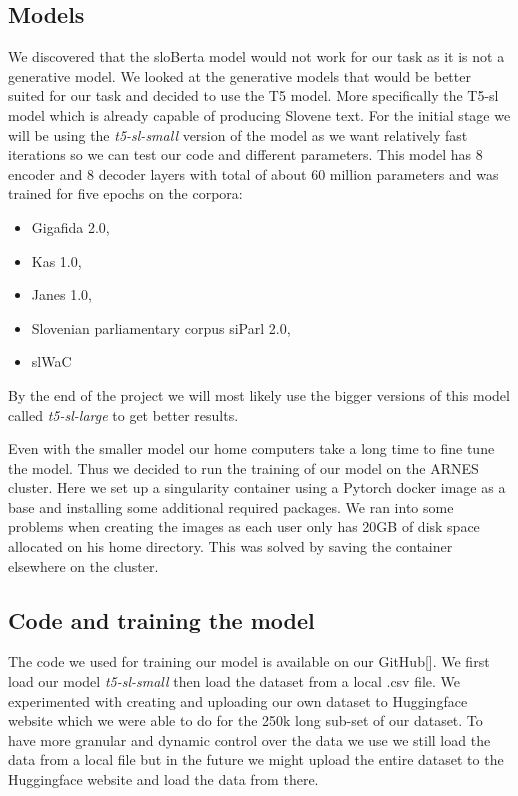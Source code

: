 \documentclass[fleqn,moreauthors,10pt]{ds_report}
\begin{document}
\subsection{Models}

We discovered that the sloBerta model would not work for our task as it is not a generative model. We looked at the generative models that would be better suited for our task and decided to use the T5 model. More specifically the T5-sl model which is already capable of producing Slovene text. For the initial stage we will be using the \emph{t5-sl-small} version of the model as we want relatively fast iterations so we can test our code and different parameters. This model has 8 encoder and 8 decoder layers with total of about 60 million parameters and was trained for five epochs on the corpora:
\begin{itemize}[itemsep=2pt]
    \item Gigafida 2.0,
    \item Kas 1.0,
    \item Janes 1.0,
    \item Slovenian parliamentary corpus siParl 2.0,
    \item slWaC
\end{itemize}
By the end of the project we will most likely use the bigger versions of this model called \emph{t5-sl-large} to get better results.

Even with the smaller model our home computers take a long time to fine tune the model. Thus we decided to run the training of our model on the ARNES cluster. Here we set up a singularity container using a Pytorch docker image as a base and installing some additional required packages. We ran into some problems when creating the images as each user only has 20GB of disk space allocated on his home directory. This was solved by saving the container elsewhere on the cluster. 

\subsection{Code and training the model}
The code we used for training our model is available on our GitHub[\cite{GitHub}]. We first load our model \emph{t5-sl-small} then load the dataset from a local .csv file. We experimented with creating and uploading our own dataset to Huggingface website which we were able to do for the 250k long sub-set of our dataset. To have more granular and dynamic control over the data we use we still load the data from a local file but in the future we might upload the entire dataset to the Huggingface website and load the data from there.
\end{document}
